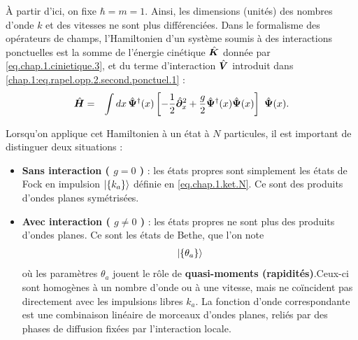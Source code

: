 À partir d’ici, on fixe $\hbar = m = 1 $. Ainsi, les dimensions (unités) des nombres d’onde $k$ et des vitesses ne sont plus différenciées.
Dans le formalisme des opérateurs de champs, l’Hamiltonien d’un système soumis à des interactions ponctuelles est la somme de l’énergie cinétique $\hat{\bm{K}}$ donnée par \eqref{eq.chap.1.cinietique.3}, et du terme d’interaction $\hat{\bm{V}}$ introduit dans \eqref{chap.1:eq.rapel.opp.2.second.ponctuel.1} :
\begin{eqnarray}\label{chap.1:eq.LL.champ.1}
	\operator{H} & = & \int dx \, \operator{\Psi}^\dag (x)\left [-\frac{1}{2}\operator{\partial}_x^2 + \frac{g}{2}  \operator{\Psi}^\dag (x) \operator{\Psi} (x) \right ] \operator{\Psi} (x) \label{chap:1:ham.mod}.
\end{eqnarray}

\medskip


Lorsqu’on applique cet Hamiltonien à un état à $N$ particules, il est important de distinguer deux situations :
\begin{itemize}[label = $\bullet$]
	\item {\bf Sans interaction ( $g =0$ )} : les états propres sont simplement les états de Fock en impulsion $\ket{\{k_a \}}$ définie en \eqref{eq.chap.1.ket.N}. Ce sont des produits d’ondes planes symétrisées.
	\item {\bf Avec interaction ( $g \neq 0$ )} : les états propres ne sont plus des produits d’ondes planes. Ce sont les états de Bethe, que l’on note 
		\begin{eqnarray}
			\ket{\{\theta_a \}}	
		\end{eqnarray}
		où les paramètres $\theta_a$ jouent le rôle de {\bf quasi-moments (rapidités)}.Ceux-ci sont homogènes à un nombre d’onde ou à une vitesse, mais ne coïncident pas directement avec les impulsions libres $k_a$. La fonction d’onde correspondante est une combinaison linéaire de morceaux d’ondes planes, reliés par des phases de diffusion fixées par l’interaction locale.
\end{itemize}

\medskip


